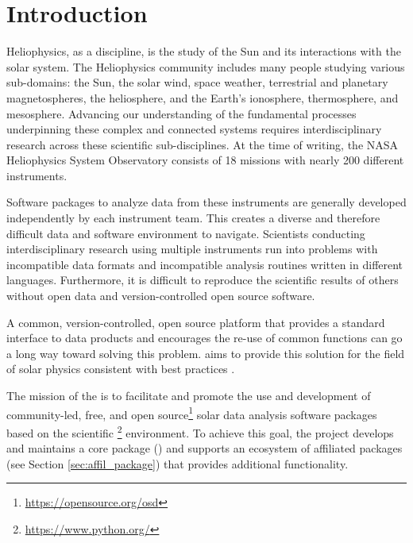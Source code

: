 \section{Introduction}
\label{sec:intro}

Heliophysics, as a discipline, is the study of the Sun and its interactions with the solar system.
The Heliophysics community includes many people studying various sub-domains: the Sun, the solar wind, space weather, terrestrial and planetary magnetospheres, the heliosphere, and the Earth's ionosphere, thermosphere, and mesosphere.
Advancing our understanding of the fundamental processes underpinning these complex and connected systems requires interdisciplinary research across these scientific sub-disciplines.
At the time of writing, the NASA Heliophysics System Observatory consists of 18 missions with nearly 200 different instruments.

Software packages to analyze data from these instruments are generally developed independently by each instrument team.
This creates a diverse and therefore difficult data and software environment to navigate.
Scientists conducting interdisciplinary research using multiple instruments run into problems with incompatible data formats and incompatible analysis routines written in different languages.
Furthermore, it is difficult to reproduce the scientific results of others without open data and version-controlled open source software.

A common, version-controlled, open source platform that provides a standard interface to data products and encourages the re-use of common functions can go a long way toward solving this problem.
\sunpyproj aims to provide this solution for the field of solar physics consistent with best practices \citep{Wilson:2014cka}.

The mission of the \sunpyproj is to facilitate and promote the use and development of community-led, free, and open source\footnote{\url{https://opensource.org/osd}} solar data analysis software packages based on the scientific \python\footnote{\url{https://www.python.org/}} environment.
To achieve this goal, the project develops and maintains a core package (\sunpypkg) and supports an ecosystem of affiliated packages (see Section \ref{sec:affil_package}) that provides additional functionality.

